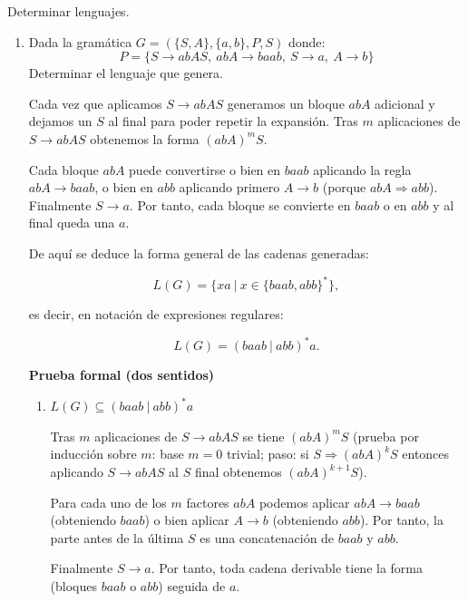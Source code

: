 \documentclass[12pt]{book} %
\begin{document}
\begin{ejercicio}
Determinar lenguajes.
\end{ejercicio}

\begin{enumerate}
\def\labelenumi{\alph{enumi})}
\item
  Dada la gramática \(G = (\{S, A\}, \{a, b\}, P, S)\) donde:\\
  \[P = \{S \to abAS, \ abA \to baab, \ S \to a, \ A \to b\}\]
  Determinar el lenguaje que genera.

  \begin{solucion}[Ejercicio 2.a]

       Cada vez que aplicamos $S \to abAS$ generamos un bloque $abA$ adicional y dejamos un $S$ al final para poder repetir la expansión. Tras $m$ aplicaciones de $S \to abAS$ obtenemos la forma $(abA)^mS$.

       Cada bloque $abA$ puede convertirse o bien en $baab$ aplicando la regla $abA \to baab$, o bien en $abb$ aplicando primero $A \to b$ (porque $abA \Rightarrow abb$). Finalmente $S \to a$. Por tanto, cada bloque se convierte en $baab$ o en $abb$ y al final queda una $a$.

       De aquí se deduce la forma general de las cadenas generadas:

       $$
       L(G) = \{ xa \ | \ x \in \{baab, abb\}^* \},
       $$

       es decir, en notación de expresiones regulares:

       $$
       L(G) = (baab \ | \ abb)^* a.
       $$

       \textbf{Prueba formal (dos sentidos)}

       \begin{enumerate}
           \item $L(G) \subseteq (baab \ | \ abb)^* a$

               Tras $m$ aplicaciones de $S \to abAS$ se tiene $(abA)^mS$ (prueba por inducción sobre $m$: base $m=0$ trivial; paso: si $S \Rightarrow (abA)^kS$ entonces aplicando $S \to abAS$ al $S$ final obtenemos $(abA)^{k+1}S$).

               Para cada uno de los $m$ factores $abA$ podemos aplicar $abA \to baab$ (obteniendo $baab$) o bien aplicar $A \to b$ (obteniendo $abb$). Por tanto, la parte antes de la última $S$ es una concatenación de $baab$ y $abb$.

               Finalmente $S \to a$. Por tanto, toda cadena derivable tiene la forma (bloques $baab$ o $abb$) seguida de $a$.


\end{enumerate}
\end{solucion}
\end{enumerate}
\end{document}
